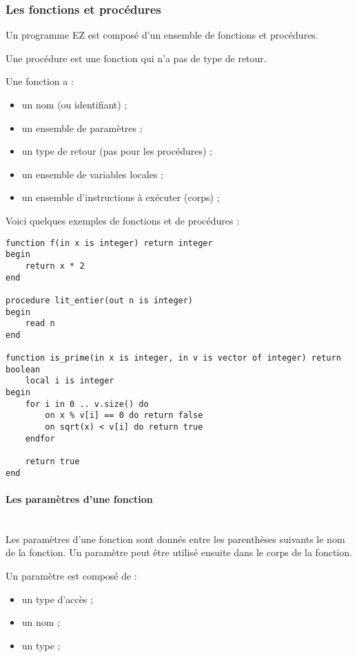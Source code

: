 \subsubsection{Les fonctions et procédures}

Un programme EZ est composé d'un ensemble de fonctions et procédures.

Une procédure est une fonction qui n'a pas de type de retour.

Une fonction a :
\begin{itemize}
    \item un nom (ou identifiant) ;
    \item un ensemble de paramètres ;
    \item un type de retour (pas pour les procédures) ;
    \item un ensemble de variables locales ;
    \item un ensemble d'instructions à exécuter (corps) ;
\end{itemize}

Voici quelques exemples de fonctions et de procédures :
\begin{verbatim}
function f(in x is integer) return integer
begin
    return x * 2
end

procedure lit_entier(out n is integer)
begin
    read n
end

function is_prime(in x is integer, in v is vector of integer) return boolean
    local i is integer
begin
    for i in 0 .. v.size() do
        on x % v[i] == 0 do return false
        on sqrt(x) < v[i] do return true
    endfor

    return true
end
\end{verbatim}

\paragraph{Les paramètres d'une fonction}\mbox{} \\

Les paramètres d'une fonction sont donnés entre les parenthèses suivants le
nom de la fonction. Un paramètre peut être utilisé ensuite dans le corps de
la fonction.

Un paramètre est composé de :
\begin{itemize}
    \item un type d'accès ;
    \item un nom ;
    \item un type ;
\end{itemize}

